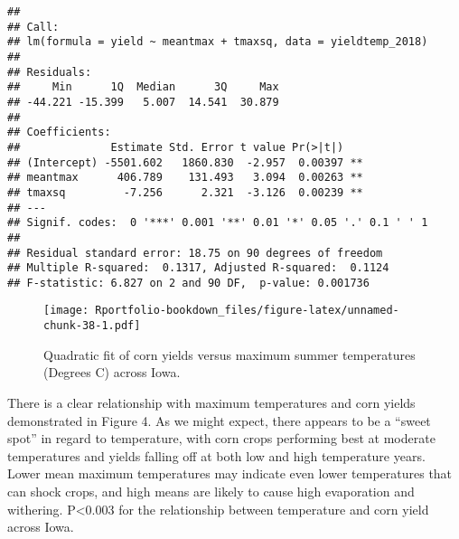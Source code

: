 \documentclass[
]{book}
\newenvironment{Shaded}{\begin{snugshade}}{\end{snugshade}}
\newcommand{\AttributeTok}[1]{\textcolor[rgb]{0.77,0.63,0.00}{#1}}
\newcommand{\FunctionTok}[1]{\textcolor[rgb]{0.00,0.00,0.00}{#1}}
\newcommand{\NormalTok}[1]{#1}
\newcommand{\OtherTok}[1]{\textcolor[rgb]{0.56,0.35,0.01}{#1}}
\newcommand{\SpecialCharTok}[1]{\textcolor[rgb]{0.00,0.00,0.00}{#1}}
\newcommand{\StringTok}[1]{\textcolor[rgb]{0.31,0.60,0.02}{#1}}
\begin{document}
\begin{verbatim}
## 
## Call:
## lm(formula = yield ~ meantmax + tmaxsq, data = yieldtemp_2018)
## 
## Residuals:
##     Min      1Q  Median      3Q     Max 
## -44.221 -15.399   5.007  14.541  30.879 
## 
## Coefficients:
##              Estimate Std. Error t value Pr(>|t|)   
## (Intercept) -5501.602   1860.830  -2.957  0.00397 **
## meantmax      406.789    131.493   3.094  0.00263 **
## tmaxsq         -7.256      2.321  -3.126  0.00239 **
## ---
## Signif. codes:  0 '***' 0.001 '**' 0.01 '*' 0.05 '.' 0.1 ' ' 1
## 
## Residual standard error: 18.75 on 90 degrees of freedom
## Multiple R-squared:  0.1317, Adjusted R-squared:  0.1124 
## F-statistic: 6.827 on 2 and 90 DF,  p-value: 0.001736
\end{verbatim}

\begin{Shaded}
\end{Shaded}

\begin{figure}
\centering
\texttt{[image: Rportfolio-bookdown\_files/figure-latex/unnamed-chunk-38-1.pdf]}
\caption{\label{fig:unnamed-chunk-38}Quadratic fit of corn yields versus maximum summer temperatures (Degrees C) across Iowa.}
\end{figure}

There is a clear relationship with maximum temperatures and corn yields demonstrated in Figure 4. As we might expect, there appears to be a ``sweet spot'' in regard to temperature, with corn crops performing best at moderate temperatures and yields falling off at both low and high temperature years. Lower mean maximum temperatures may indicate even lower temperatures that can shock crops, and high means are likely to cause high evaporation and withering. P\textless0.003 for the relationship between temperature and corn yield across Iowa.
\end{document}
